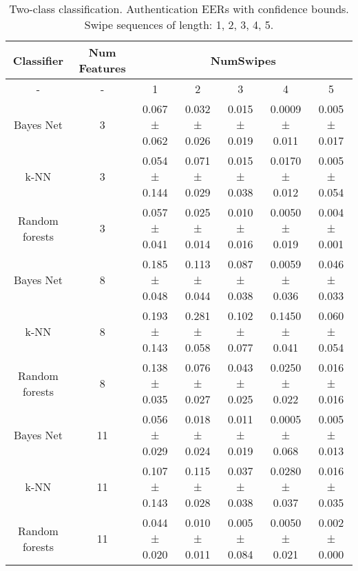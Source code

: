 \documentclass[referee]{raa}            %
\begin{document}
\begin{table}
    \centering
    \begin{tabular}{|c|c|c|c|c|c|c|}
    \hline
    Classifier & Num Features & \multicolumn{5}{|c|}{NumSwipes} \\
    \hline
    - & - & 1 & 2 & 3 & 4 & 5 \\
    \hline
         Bayes Net&  3&  0.067 ± 0.062&  0.032 ± 0.026&  0.015 ± 0.019&  0.0009 ± 0.011& 0.005 ± 0.017\\
         k-NN&  3&  0.054 ± 0.144&  0.071 ± 0.029&  0.015 ± 0.038& 0.0170 ± 0.012   & 0.005 ± 0.054\\
         Random forests&  3&  0.057 ± 0.041&  0.025 ± 0.014&  0.010 ± 0.016&  0.0050 ± 0.019& 0.004 ± 0.001\\
         \hline
         Bayes Net&  8&  0.185 ± 0.048& 0.113 ± 0.044  &  0.087 ± 0.038&  0.0059 ± 0.036& 0.046 ± 0.033\\
         k-NN&  8& 0.193 ± 0.143 &  0.281 ± 0.058&  0.102 ± 0.077& 0.1450 ± 0.041  & 0.060 ± 0.054\\
         Random forests&  8&  0.138 ± 0.035&  0.076 ± 0.027&  0.043 ± 0.025&  0.0250 ± 0.022& 0.016 ± 0.016\\
         \hline
         Bayes Net&  11&  0.056 ± 0.029& 0.018 ± 0.024  & 0.011 ± 0.019 & 0.0005 ± 0.068 & 0.005 ± 0.013\\
         k-NN&  11& 0.107 ± 0.143 & 0.115 ± 0.028 & 0.037 ± 0.038 & 0.0280 ± 0.037  & 0.016 ± 0.035\\
         Random forests&  11&  0.044 ± 0.020& 0.010 ± 0.011 & 0.005 ± 0.084 & 0.0050 ± 0.021 & 0.002 ± 0.000\\
         \hline
    \end{tabular}
    \caption{Two-class classification. Authentication EERs with confidence bounds. Swipe sequences of length: 1, 2, 3, 4, 5.}
    \label{Tab2}
\end{table}
\par
\end{document}
